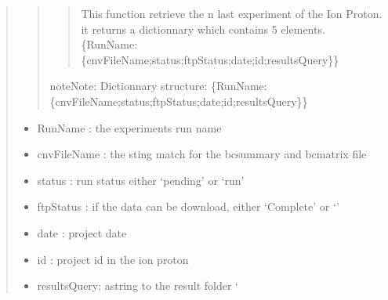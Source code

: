 \documentclass[letterpaper,10pt,english]{sphinxmanual}
\begin{document}
\begin{fulllineitems}
\begin{quote}
\begin{description}
\begin{quote}
\begin{quote}
This function retrieve the n last experiment of the Ion Proton.
it returns a dictionnary which contains 5 elements.
\{RunName: \{cnvFileName;status;ftpStatus;date;id;resultsQuery\}\}
\end{quote}

\begin{notice}{note}{Note:}
Dictionnary structure: \{RunName: \{cnvFileName;status;ftpStatus;date;id;resultsQuery\}\}
\end{notice}
\end{quote}
\begin{itemize}
\item {} 
RunName : the experiments run name

\item {} 
cnvFileName : the sting match for the bcsummary and bcmatrix file

\item {} 
status :  run status either `pending' or `run'

\item {} 
ftpStatus : if the data can be download, either `Complete' or `'

\item {} 
date : project date

\item {} 
id : project id in the ion proton

\item {} 
resultsQuery: astring to the result folder {}`

\end{itemize}


\end{description}\end{quote}

\end{fulllineitems}

\end{document}

